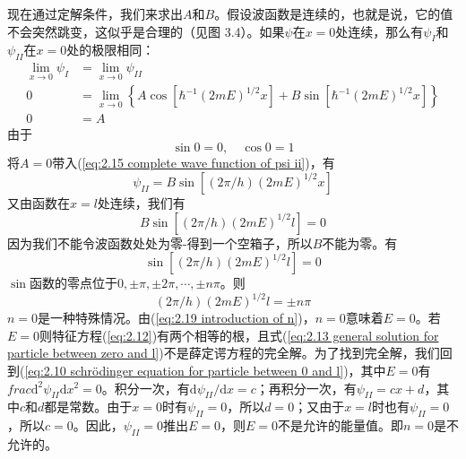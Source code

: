 	\indent 现在通过定解条件，我们来求出$A$和$B$。假设波函数是连续的，也就是说，它的值不会突然跳变，这似乎是合理的（见图 3.4）。如果$\psi$在$x=0$处连续，那么有$\psi_I$和$\psi_{II}$在$x=0$处的极限相同：
	\begin{equation*}
		\begin{aligned}
			\lim\limits_{x \to 0}\psi_I & = \lim\limits_{x \to 0}\psi_{II} \\
			0 & = \lim\limits_{x \to 0}\left\{A \cos\left[\hbar^{-1}\left(2mE\right)^{1/2}x\right]+B \sin\left[\hbar^{-1}\left(2mE\right)^{1/2}x\right]\right\} \\
			0 & = A
		\end{aligned}
	\end{equation*}
	由于
	\begin{equation}
		\boxed{
			\sin 0 = 0, \quad \cos 0 =1
		}
		\label{eq:2.16 sin0 and cos0}
	\end{equation}
	将$A=0$带入(\ref{eq:2.15 complete wave function of psi ii})，有
	\begin{equation}
		\psi_{II} = B\sin\left[\left(2\pi/h\right)\left(2mE\right)^{1/2}x\right]
		\label{eq:2.17 }
	\end{equation}
	又由函数在$x=l$处连续，我们有
	\begin{equation}
		B\sin\left[\left(2\pi/h\right)\left(2mE\right)^{1/2}l\right]=0
		\label{eq:2.18}
	\end{equation}
	因为我们不能令波函数处处为零-得到一个空箱子，所以$B$不能为零。有
	\begin{equation*}
		\sin\left[\left(2\pi/h\right)\left(2mE\right)^{1/2}l\right]=0
	\end{equation*}
	$\sin$函数的零点位于$0, \pm \pi, \pm 2\pi, \cdots, \pm n \pi$。则
	\begin{equation}
		\left(2\pi/h\right)\left(2mE\right)^{1/2}l = \pm n \pi
		\label{eq:2.19 introduction of n}
	\end{equation}
	\indent $n=0$是一种特殊情况。由(\ref{eq:2.19 introduction of n})，$n=0$意味着$E=0$。若$E=0$则特征方程(\ref{eq:2.12})有两个相等的根，且式(\ref{eq:2.13 general solution for particle between zero and l})不是薛定谔方程的完全解。为了找到完全解，我们回到(\ref{eq:2.10 schrödinger equation for particle between 0 and l})，其中$E=0$有$frac{\mathrm{d}^2\psi_{II}}{\mathrm{d}x^2}=0$。积分一次，有$\mathrm{d}\psi_{II}/\mathrm{d}x = c$；再积分一次，有$\psi_{II}=cx+d$，其中$c$和$d$都是常数。由于$x=0$时有$\psi_{II}=0$，所以$d=0$；又由于$x=l$时也有$\psi_{II}=0$，所以$c=0$。因此，$\psi_{II}=0$推出$E=0$，则$E=0$不是允许的能量值。即$n=0$是不允许的。\\

